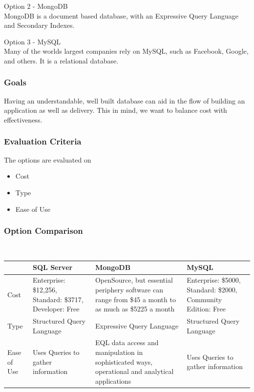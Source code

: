 \documentclass[onecolumn, draftclsnofoot,10pt, compsoc]{IEEEtran}
\begin{document}
{\medskip
\noindent Option 2 - MongoDB \\
\noindent MongoDB is a document based database, with an Expressive Query Language and Secondary Indexes. \cite{MongoDB}

\medskip
\noindent Option 3 - MySQL \\
\noindent Many of the worlds largest companies rely on MySQL, such as Facebook, Google, and others. It is a relational database. \cite{MySQL}

\subsubsection{Goals}
\noindent Having an understandable, well built database can aid in the flow of building an application as well as delivery. This in mind, we want to balance cost with effectiveness.


\subsubsection{Evaluation Criteria}
\noindent The options are evaluated on
\begin{itemize}
\item Cost
\item Type
\item Ease of Use
\end{itemize}



\subsubsection{Option Comparison} ~\\
\tablehead{}
\begin{supertabular}{|p{2.5cm}|p{4.5cm}|p{4.5cm}|p{4.5cm}|}
\hline & SQL Server & MongoDB & MySQL\\ \hline
Cost & Enterprise: \$12,256, Standard: \$3717, Developer: Free & OpenSource, but essential periphery software can range from \$45 a month to as much as \$5225 a month & Enterprise: \$5000, Standard: \$2000, Community Edition: Free \\ \hline
Type & Structured Query Language & Expressive Query Language & Structured Query Language\\ \hline
Ease of Use & Uses Queries to gather information & EQL data access and manipulation in sophisticated ways, operational and analytical applications \cite{ibmbpnetwork} & Uses Queries to gather information \\ \hline
\end{supertabular}

}
\end{document}
